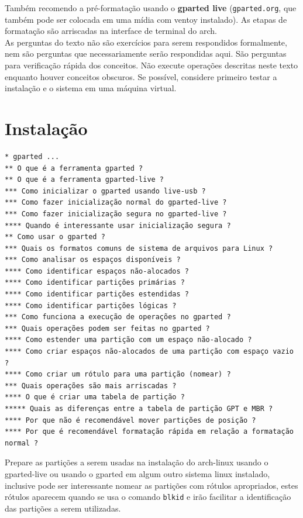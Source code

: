 \documentclass[12pt,a4paper]{article}
\begin{document}
Também recomendo a pré-formatação usando o \textbf{gparted live} (\texttt{gparted.org}, que também pode ser colocada em uma mídia com ventoy instalado). As etapas de formatação são arriscadas na interface de terminal do arch.\\

As perguntas do texto não são exercícios para serem respondidos formalmente, nem são perguntas que necessariamente serão respondidas aqui. São perguntas para verificação rápida dos conceitos. Não execute operações descritas neste texto enquanto houver conceitos obscuros. Se possível, considere primeiro testar a instalação e o sistema em uma máquina virtual.\\

\section{Instalação} 

\begin{lstlisting}
* gparted ...
** O que é a ferramenta gparted ?
** O que é a ferramenta gparted-live ?
*** Como inicializar o gparted usando live-usb ?
*** Como fazer inicialização normal do gparted-live ?
*** Como fazer inicialização segura no gparted-live ?
**** Quando é interessante usar inicialização segura ? 
** Como usar o gparted ?
*** Quais os formatos comuns de sistema de arquivos para Linux ?
*** Como analisar os espaços disponíveis ?
**** Como identificar espaços não-alocados ?
**** Como identificar partições primárias ?
**** Como identificar partições estendidas ?
**** Como identificar partições lógicas ? 
*** Como funciona a execução de operações no gparted ? 
*** Quais operações podem ser feitas no gparted ?
**** Como estender uma partição com um espaço não-alocado ?
**** Como criar espaços não-alocados de uma partição com espaço vazio ?
**** Como criar um rótulo para uma partição (nomear) ? 
*** Quais operações são mais arriscadas ?
**** O que é criar uma tabela de partição ?
***** Quais as diferenças entre a tabela de partição GPT e MBR ? 
**** Por que não é recomendável mover partições de posição ? 
**** Por que é recomendável formatação rápida em relação a formatação normal ? 
\end{lstlisting}

\vspace{\baselineskip}

Prepare as partições a serem usadas na instalação do arch-linux usando o gparted-live ou usando o gparted em algum outro sistema linux instalado, inclusive pode ser interessante nomear as partições com rótulos apropriados, estes rótulos aparecem quando se usa o comando \texttt{blkid} e irão facilitar a identificação das partições a serem utilizadas.\\
\end{document}
